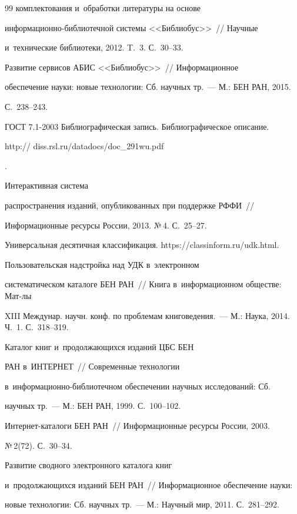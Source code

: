 {{\begin{thebibliography}{99}
комплектования и~обработки литературы на основе  

ин\-фор\-ма\-ци\-он\-но-биб\-лио\-теч\-ной системы <<Библиобус>>~/\!\!/ Научные 

и~технические библиотеки, 2012. T.~3. С.~30--33.


 Развитие сервисов АБИС <<Библиобус>>~/\!\!/ Информационное 

обеспечение науки: новые технологии: Сб. научных тр.~--- М.: БЕН РАН, 2015.  

С.~238--243.


ГОСТ 7.1-2003 Библиографическая запись. Библиографическое описание. {\sf 

http:// diss.rsl.ru/datadocs/doc\_291wu.pdf}.


 Интерактивная система 

распространения изданий, опубликованных при поддержке РФФИ~/\!\!/ 

Информационные ресурсы России, 2013. №\,4. С.~25--27.


Универсальная десятичная классификация. {\sf https://classinform.ru/udk.html}.


 Пользовательская надстройка над УДК в~электронном 

систематическом каталоге БЕН РАН~/\!\!/ Книга в~информационном обществе: Мат-лы 

XIII Междунар. научн. конф. по проблемам книговедения.~--- М.: Наука, 2014. Ч.~1. С.~318--319.


 Каталог книг и~продолжающихся изданий ЦБС БЕН

РАН  в~ИНТЕРНЕТ~/\!\!/ Современные технологии  

в~ин\-фор\-ма\-ци\-он\-но-биб\-лио\-теч\-ном обеспечении научных исследований: Сб. 

научных тр.~--- М.: БЕН РАН, 1999. С.~100--102.



Ин\-тер\-нет-ка\-та\-ло\-ги БЕН РАН~/\!\!/ Информационные ресурсы России, 2003. 

 №\,2(72). С.~30--34.


 Развитие сводного электронного каталога книг 

и~продолжающихся изданий БЕН РАН~/\!\!/ Информационное обеспечение науки: 

новые технологии: Сб. научных тр.~--- М.: Научный мир, 2011. С.~281--292.

        \end{thebibliography}

} }
